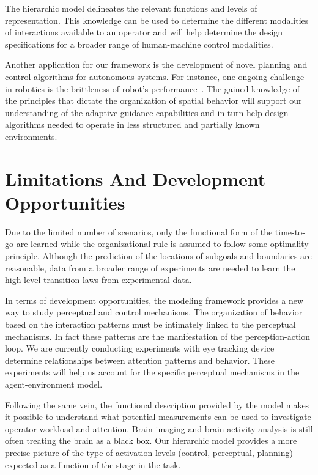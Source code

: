 \documentclass[journal]{IEEEtran}
\begin{document}
The hierarchic model delineates the relevant functions and levels of representation.  This knowledge can be used to determine the different modalities of interactions available to an operator and will help determine the design specifications for a broader range of human-machine control modalities. 

Another application for our framework is the development of novel planning and control algorithms for autonomous systems. For instance, one ongoing challenge in robotics is the brittleness of robot's performance~\cite{campbell2010autonomous}. The gained knowledge of the principles that dictate the organization of spatial behavior will support our understanding of the adaptive guidance capabilities and in turn help design algorithms needed to operate in less structured and partially known environments.

\section{Limitations And Development Opportunities}

Due to the limited number of scenarios, only the functional form of the time-to-go are learned while the organizational rule is assumed to follow some optimality principle. Although the prediction of the locations of subgoals and boundaries are reasonable, data from a broader range of experiments are needed to learn the high-level transition laws from experimental data.   

In terms of development opportunities, the modeling framework provides a new way to study perceptual and control mechanisms. The organization of behavior based on the interaction patterns must be intimately linked to the perceptual mechanisms. In fact these patterns are the manifestation of the perception-action loop. We are currently conducting experiments with eye tracking device determine relationships between attention patterns and behavior. These experiments will help us account for the specific perceptual mechanisms in the agent-environment model.   

Following the same vein, the functional description provided by the model makes it possible to understand what potential measurements can be used to investigate operator workload and attention. Brain imaging and brain activity analysis is still often treating the brain as a black box. Our hierarchic model provides a more precise picture of the type of activation levels (control, perceptual, planning) expected as a function of the stage in the task.



\end{document}
